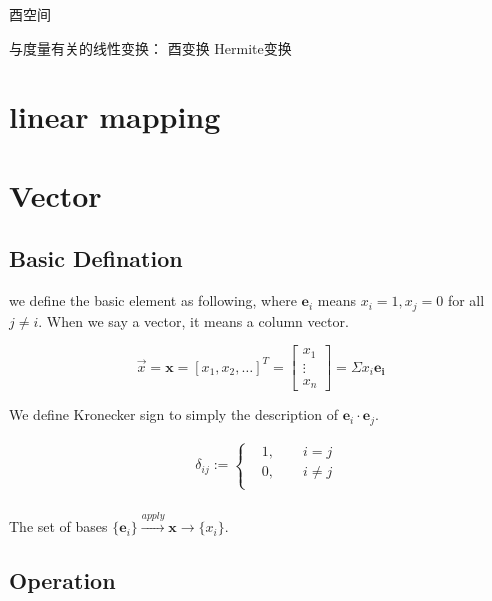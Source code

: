 \documentclass[UTF8]{../../09-Mathematics}
\begin{document}
酉空间 


与度量有关的线性变换：
酉变换
Hermite变换



\chapter{linear mapping}


\chapter{Vector}


\section{Basic Defination}

we define the basic element as following, where $ \boldsymbol e_i $ means $x_i = 1, x_j = 0$ for all $j \neq i$. When we say a vector, it means a column vector.

\begin{equation}
\vec{x}  = \boldsymbol x = [x_1, x_2,\dots]^T
= \begin{bmatrix}
    x_1 \\
    \vdots \\
    x_n
\end{bmatrix}
= \Sigma x_i \boldsymbol{e_i} 
\end{equation}

We define Kronecker sign to simply the description of $\boldsymbol e_i \cdot \boldsymbol e_j $.

\begin{equation}
    \begin{split}
    &\delta _{ij}:=
    \begin{cases}
    &1,\qquad i = j\\
    &0,\qquad i \neq j\\
    \end{cases}\\
    \end{split}
\end{equation}

The set of bases $\{ \boldsymbol e_i  \}  \xrightarrow{apply} \boldsymbol{x} \longrightarrow    \{ x_i \}   $.





\section{Operation}
\end{document}
